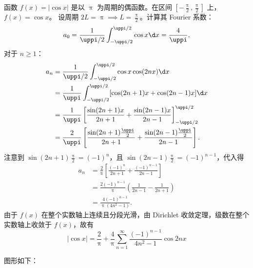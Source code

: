 \begin{myproof}
    函数 $f(x) = |\cos x|$ 是以 $\uppi$ 为周期的偶函数。在区间 $\left[-\frac{\uppi}{2}, \frac{\uppi}{2}\right]$ 上，$f(x) = \cos x$。
    设周期 $2L = \uppi \implies L = \frac{\uppi}{2}$。计算其 Fourier 系数：
    \begin{equation}\label{eq:abs-cos-a0}
        a_0 = \frac{1}{\uppi/2} \int_{-\uppi/2}^{\uppi/2} \cos x \d x = \frac{4}{\uppi},
    \end{equation}
    对于 $n \geqslant 1$：
    \begin{equation}\label{eq:abs-cos-an}
        \begin{aligned}
            a_n & = \frac{1}{\uppi/2} \int_{-\uppi/2}^{\uppi/2} \cos x \cos(2nx) \d x                                               \\
                & = \frac{1}{\uppi} \int_{-\uppi/2}^{\uppi/2} [\cos(2n+1)x + \cos(2n-1)x] \d x                                      \\
                & = \frac{1}{\uppi} \left[ \frac{\sin(2n+1)x}{2n+1} + \frac{\sin(2n-1)x}{2n-1} \right]_{-\uppi/2}^{\uppi/2}         \\
                & = \frac{2}{\uppi} \left[ \frac{\sin(2n+1)\frac{\uppi}{2}}{2n+1} + \frac{\sin(2n-1)\frac{\uppi}{2}}{2n-1} \right].
        \end{aligned}
    \end{equation}
    注意到 $\sin(2n+1)\frac{\uppi}{2} = (-1)^n$，且 $\sin(2n-1)\frac{\uppi}{2} = (-1)^{n-1}$，代入得
    \begin{equation}\label{eq:abs-cos-an-result}
        \begin{aligned}
            a_n & = \frac{2}{\uppi} \left[ \frac{(-1)^n}{2n+1} + \frac{(-1)^{n-1}}{2n-1} \right] \\
                & = \frac{2(-1)^{n-1}}{\uppi} \left( \frac{1}{2n-1} - \frac{1}{2n+1} \right)     \\
                & = \frac{4(-1)^{n-1}}{\uppi(4n^2 - 1)}.
        \end{aligned}
    \end{equation}
    由于 $f(x)$ 在整个实数轴上连续且分段光滑，由 Dirichlet 收敛定理，级数在整个实数轴上收敛于 $f(x)$，故有
    \begin{equation}
        \boxed{|\cos x| = \frac{2}{\uppi} + \frac{4}{\uppi} \sum_{n=1}^{\infty} \frac{(-1)^{n-1}}{4n^2 - 1} \cos 2nx}
    \end{equation}


    图形如下：
    \begin{center}
\end{center}
\end{myproof}

